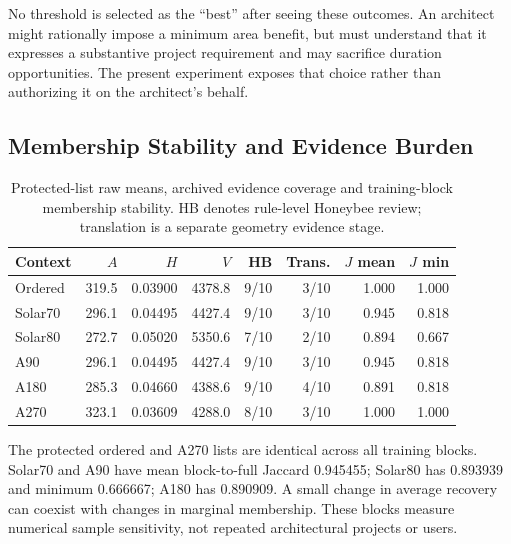 \documentclass{llncs}
\begin{document}
No threshold is selected as the ``best'' after seeing these outcomes. An architect might rationally impose a minimum area benefit, but must understand that it expresses a substantive project requirement and may sacrifice duration opportunities. The present experiment exposes that choice rather than authorizing it on the architect's behalf.

\subsection{Membership Stability and Evidence Burden}
\begin{table}[tbp]\centering\small\caption{Protected-list raw means, archived evidence coverage and training-block membership stability. HB denotes rule-level Honeybee review; translation is a separate geometry evidence stage.}\label{tab:evidence}
\begin{tabular}{lrrrrrrr}\toprule
Context & $A$ & $H$ & $V$ & HB & Trans. & $J$ mean & $J$ min\\\midrule
Ordered & 319.5 & 0.03900 & 4378.8 & 9/10 & 3/10 & 1.000 & 1.000\\
Solar70 & 296.1 & 0.04495 & 4427.4 & 9/10 & 3/10 & 0.945 & 0.818\\
Solar80 & 272.7 & 0.05020 & 5350.6 & 7/10 & 2/10 & 0.894 & 0.667\\
A90 & 296.1 & 0.04495 & 4427.4 & 9/10 & 3/10 & 0.945 & 0.818\\
A180 & 285.3 & 0.04660 & 4388.6 & 9/10 & 4/10 & 0.891 & 0.818\\
A270 & 323.1 & 0.03609 & 4288.0 & 8/10 & 3/10 & 1.000 & 1.000\\
\bottomrule\end{tabular}\end{table}

The protected ordered and A270 lists are identical across all training blocks. Solar70 and A90 have mean block-to-full Jaccard 0.945455; Solar80 has 0.893939 and minimum 0.666667; A180 has 0.890909. A small change in average recovery can coexist with changes in marginal membership. These blocks measure numerical sample sensitivity, not repeated architectural projects or users.
\end{document}
